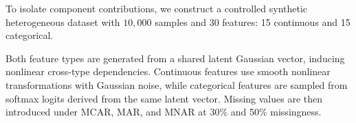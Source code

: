\documentclass[times, review, 10pt]{elsarticle}
\begin{document}
To isolate component contributions, we construct a controlled synthetic
heterogeneous dataset with $10{,}000$ samples and 30 features: 15 continuous
and 15 categorical.

Both feature types are generated from a shared latent Gaussian vector, inducing
nonlinear cross-type dependencies. Continuous features use smooth nonlinear
transformations with Gaussian noise, while categorical features are sampled
from softmax logits derived from the same latent vector. Missing values are
then introduced under MCAR, MAR, and MNAR at 30\% and 50\% missingness.






\end{document}
